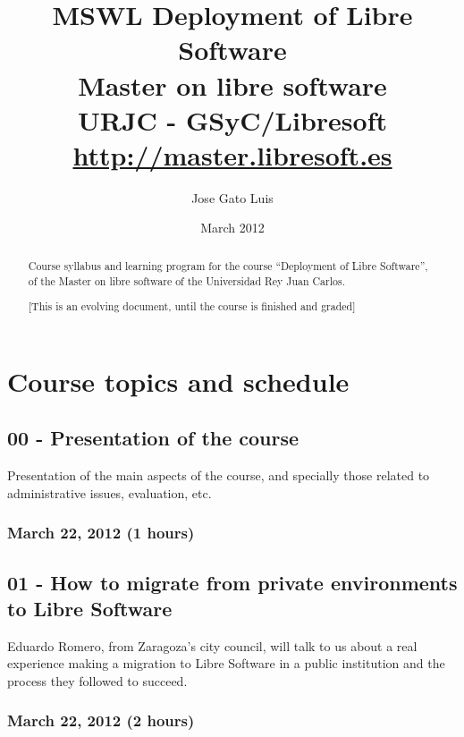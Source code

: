 \documentclass[a4paper]{article}
\title{MSWL Deployment of Libre Software \\
Master on libre software \\
URJC - GSyC/Libresoft \\
\url{http://master.libresoft.es}}
\author{Jose Gato Luis}
\date{March 2012}
\begin{document}
\maketitle

\begin{abstract}
Course syllabus and learning program for the course ``Deployment of Libre Software'', of the Master on libre software of the
Universidad Rey Juan Carlos.

[This is an evolving document, until the course is finished and graded]
\end{abstract}

\tableofcontents

\section{Course topics and schedule}

\subsection{00 - Presentation of the course}

Presentation of the main aspects of the course, and specially those
related to administrative issues, evaluation, etc.

\subsubsection{March 22, 2012 (1 hours)}

\subsection{01 - How to migrate from private environments to Libre Software}

Eduardo Romero, from Zaragoza's city council, will talk to us about a real experience making a migration to Libre Software in a public institution and the process they followed to succeed. 

\subsubsection{March 22, 2012 (2 hours)}
\end{document}
